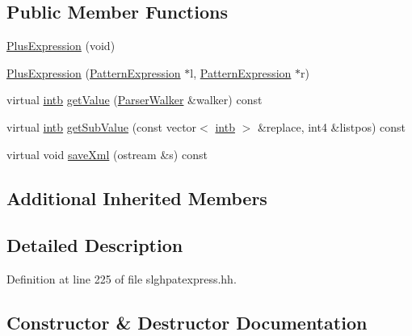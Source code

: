 \subsection*{Public Member Functions}
\begin{DoxyCompactItemize}
\item 
\mbox{\hyperlink{class_plus_expression_af26936cc1b6719ab3a6936214f59d281}{Plus\+Expression}} (void)
\item 
\mbox{\hyperlink{class_plus_expression_a401b649b576191e05c33e0050a5a8208}{Plus\+Expression}} (\mbox{\hyperlink{class_pattern_expression}{Pattern\+Expression}} $\ast$l, \mbox{\hyperlink{class_pattern_expression}{Pattern\+Expression}} $\ast$r)
\item 
virtual \mbox{\hyperlink{types_8h_aa925ba3e627c2df89d5b1cfe84fb8572}{intb}} \mbox{\hyperlink{class_plus_expression_af0089a678032ff29d411865ede9fd94e}{get\+Value}} (\mbox{\hyperlink{class_parser_walker}{Parser\+Walker}} \&walker) const
\item 
virtual \mbox{\hyperlink{types_8h_aa925ba3e627c2df89d5b1cfe84fb8572}{intb}} \mbox{\hyperlink{class_plus_expression_a28a9c3cb49bb8515b6edc4e191beecfa}{get\+Sub\+Value}} (const vector$<$ \mbox{\hyperlink{types_8h_aa925ba3e627c2df89d5b1cfe84fb8572}{intb}} $>$ \&replace, int4 \&listpos) const
\item 
virtual void \mbox{\hyperlink{class_plus_expression_ab5da68f4bb5bed8e1eb0244f86bf8c23}{save\+Xml}} (ostream \&s) const
\end{DoxyCompactItemize}
\subsection*{Additional Inherited Members}


\subsection{Detailed Description}


Definition at line 225 of file slghpatexpress.\+hh.



\subsection{Constructor \& Destructor Documentation}
\mbox{\label{class_plus_expression_af26936cc1b6719ab3a6936214f59d281}} 
